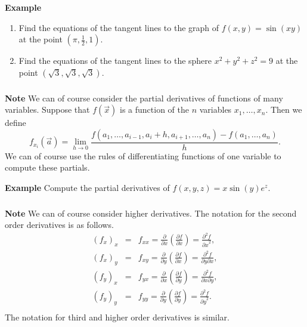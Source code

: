 \begin{frame}[fragile]\frametitle{}
\textbf{Example}
\begin{enumerate}
  \item Find the equations of the tangent lines to the graph of $f(x,y)= \sin(xy)$ at the point $(\pi,\frac{1}{2},1)$.  
  \item  Find the equations of the tangent lines to the sphere $x^2+y^2+z^2=9$  at the point $(\sqrt{3},\sqrt{3},\sqrt{3})$. 
\end{enumerate}

\end{frame}



\begin{frame}[fragile]\frametitle{}
\textbf{Note}
 We can of course consider the partial derivatives of functions of many variables.  Suppose that $f(\vec{x})$ is a function of the $n$ variables $x_1, \dots, x_n$.  Then we define 
 $$f_{x_i}(\vec{a}) = \lim_{h\rightarrow 0} \frac{f(a_1, \dots, a_{i-1}, a_i+h, a_{i+1}, \dots, a_n) - f(a_1,\dots, a_n)}{h}.$$
 We can of course use the rules of differentiating functions of one variable to compute these partials.
  

\textbf{Example}
 Compute the partial derivatives of $f(x,y,z) = x\sin(y)e^z$.

\end{frame}



\begin{frame}[fragile]\frametitle{}
\textbf{Note}
 We can of course consider higher derivatives.  The notation for the second order derivatives is as follows.
 \begin{eqnarray*}
 (f_x)_x &=& f_{xx} = \frac{\partial}{\partial x}\left( \frac{\partial f}{\partial x}\right) = \frac{\partial^2 f}{{\partial x}^2},  \\
 (f_x)_y &=& f_{xy} = \frac{\partial}{\partial y}\left( \frac{\partial f}{\partial x}\right) = \frac{\partial^2 f}{\partial y \partial x},  \\
 (f_y)_x &=& f_{yx} = \frac{\partial}{\partial x}\left( \frac{\partial f}{\partial y}\right) = \frac{\partial^2 f}{\partial x \partial y},  \\
 (f_y)_y &=& f_{yy} = \frac{\partial}{\partial y}\left( \frac{\partial f}{\partial y}\right) = \frac{\partial^2 f}{{\partial y}^2}.  \\
 \end{eqnarray*} 
 The notation for third and higher order derivatives is similar.

\end{frame}


